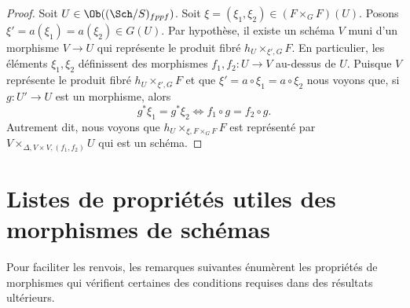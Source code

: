 \begin{proof}
Soit $U \in \Ob((\Sch/S)_{fppf})$. Soit
$\xi = (\xi_1, \xi_2) \in (F \times_G F)(U)$.
Posons $\xi' = a(\xi_1) = a(\xi_2) \in G(U)$.
Par hypothèse, il existe un schéma $V$ muni d'un morphisme $V \to U$
qui représente le produit fibré $h_U \times_{\xi', G} F$.
En particulier, les éléments $\xi_1, \xi_2$ définissent des morphismes
$f_1, f_2 : U \to V$ au-dessus de $U$. Puisque $V$ représente le
produit fibré $h_U \times_{\xi', G} F$ et que
$\xi' = a \circ \xi_1 = a \circ \xi_2$
nous voyons que, si $g : U' \to U$ est un morphisme, alors
$$
g^*\xi_1 = g^*\xi_2
\Leftrightarrow
f_1 \circ g = f_2 \circ g.
$$
Autrement dit, nous voyons que $h_U \times_{\xi, F \times_G F} F$
est représenté par $V \times_{\Delta, V \times V, (f_1, f_2)} U$
qui est un schéma.
\end{proof}










\section{Listes de propriétés utiles des morphismes de schémas}
\label{section-lists}

\noindent
Pour faciliter les renvois, les remarques suivantes énumèrent les
propriétés de morphismes qui vérifient certaines des conditions
requises dans des résultats ultérieurs.

